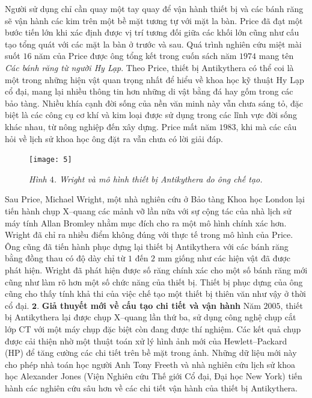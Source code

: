 \begin{multicols}{2}
	Người sử dụng chỉ cần quay một tay quay để vận hành thiết bị và các bánh răng sẽ vận hành các kim trên một bề mặt tương tự với mặt la bàn. Price đã đạt một bước tiến lớn khi xác định được vị trí tương đối giữa các khối lớn cũng như cấu tạo tổng quát với các mặt la bàn ở trước và sau. Quá trình nghiên cứu miệt mài suốt $16$ năm của Price được ông tổng kết trong cuốn sách năm $1974$ mang tên \textit{Các bánh răng từ người Hy Lạp}. Theo Price, thiết bị Antikythera có thể coi là một trong những hiện vật quan trọng nhất để hiểu về khoa học kỹ thuật Hy Lạp cổ đại, mang lại nhiều thông tin hơn những di vật bằng đá hay gốm trong các bảo tàng. Nhiều khía cạnh đời sống của nền văn minh này vẫn chưa sáng tỏ, đặc biệt là các công cụ cơ khí và kim loại được sử dụng trong các lĩnh vực đời sống khác nhau, từ nông nghiệp đến xây dựng. Price mất năm $1983$, khi mà các câu hỏi về lịch sử khoa học ông đặt ra vẫn chưa có lời giải đáp. 
	\begin{figure}[H]
		\vspace*{-5pt}
		\centering
		\captionsetup{labelformat= empty, justification=centering}
		\texttt{[image: 5]}
		\caption{\small\textit{\color{lichsutoanhoc}Hình $4$. Wright và mô hình thiết bị Antikythera do ông chế tạo.}}
		\vspace*{-10pt}
	\end{figure}
	Sau Price, Michael Wright, một nhà nghiên cứu ở Bảo tàng Khoa học London lại tiến hành chụp X--quang các mảnh vỡ lần nữa với sự cộng tác của nhà lịch sử máy tính Allan Bromley nhằm mục đích cho ra một mô hình chính xác hơn. Wright đã chỉ ra nhiều điểm không đúng với thực tế trong mô hình của Price. Ông cũng đã tiến hành phục dựng lại thiết bị Antikythera với các bánh răng bằng đồng thau có độ dày chỉ từ $1$ đến $2$ mm giống như các hiện vật đã được phát hiện. Wright đã phát hiện được số răng chính xác cho một số bánh răng mới cũng như làm rõ hơn một số chức năng của thiết bị. Thiết bị phục dựng của ông cũng cho thấy tính khả thi của việc chế tạo một thiết bị thiên văn như vậy ở thời cổ đại.
	\vskip 0.1cm
	$\pmb{2.}$ \textbf{\color{lichsutoanhoc}Giả thuyết mới về cấu tạo chi tiết và vận hành}
	\vskip 0.05cm
	Năm $2005$, thiết bị Antikythera lại được chụp X--quang lần thứ ba, sử dụng công nghệ chụp cắt lớp CT với một máy chụp đặc biệt còn đang được thí nghiệm. Các kết quả chụp được cải thiện nhờ một thuật toán xử lý hình ảnh mới của Hewlett--Packard (HP) để tăng cường các chi tiết trên bề mặt trong ảnh. Những dữ liệu mới này cho phép nhà toán học người Anh Tony Freeth và nhà nghiên cứu lịch sử khoa học Alexander Jones (Viện  Nghiên cứu Thế giới Cổ đại, Đại học New York) tiến hành các nghiên cứu sâu hơn về các chi tiết vận hành của thiết bị Antikythera.

\end{multicols}
